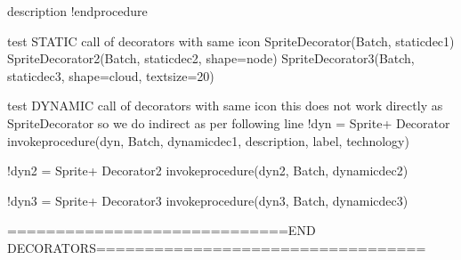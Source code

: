 \documentclass[letterpaper,10pt,english]{sphinxmanual}
\begin{document}
\begin{sphinxVerbatim}[commandchars=\\\{\},numbers=left,firstnumber=1,stepnumber=1]
  \PYGZdl{}description \PYGZdq{}
!endprocedure

\PYGZsq{} test STATIC call of decorators with same icon
\PYGZsq{}\PYGZhy{}\PYGZhy{}\PYGZhy{}\PYGZhy{}\PYGZhy{}\PYGZhy{}\PYGZhy{}\PYGZhy{}\PYGZhy{}\PYGZhy{}\PYGZhy{}\PYGZhy{}\PYGZhy{}\PYGZhy{}\PYGZhy{}\PYGZhy{}\PYGZhy{}\PYGZhy{}\PYGZhy{}\PYGZhy{}\PYGZhy{}\PYGZhy{}\PYGZhy{}\PYGZhy{}\PYGZhy{}\PYGZhy{}\PYGZhy{}\PYGZhy{}\PYGZhy{}\PYGZhy{}\PYGZhy{}\PYGZhy{}\PYGZhy{}\PYGZhy{}\PYGZhy{}\PYGZhy{}\PYGZhy{}\PYGZhy{}\PYGZhy{}\PYGZhy{}\PYGZhy{}\PYGZhy{}\PYGZhy{}\PYGZhy{}\PYGZhy{}\PYGZhy{}\PYGZhy{}\PYGZhy{}\PYGZhy{}\PYGZhy{}\PYGZhy{}
\PYGZdl{}SpriteDecorator(\PYGZdq{}\PYGZdl{}Batch\PYGZdq{}, \PYGZdq{}static\PYGZus{}dec1\PYGZdq{})
\PYGZdl{}SpriteDecorator2(\PYGZdq{}\PYGZdl{}Batch\PYGZdq{}, \PYGZdq{}static\PYGZus{}dec2\PYGZdq{}, \PYGZdl{}shape=\PYGZdq{}node\PYGZdq{})
\PYGZdl{}SpriteDecorator3(\PYGZdq{}\PYGZdl{}Batch\PYGZdq{}, \PYGZdq{}static\PYGZus{}dec3\PYGZdq{}, \PYGZdl{}shape=\PYGZdq{}cloud\PYGZdq{}, \PYGZdl{}textsize=\PYGZdq{}20\PYGZdq{})

\PYGZsq{} test DYNAMIC call of decorators with same icon
\PYGZsq{}\PYGZhy{}\PYGZhy{}\PYGZhy{}\PYGZhy{}\PYGZhy{}\PYGZhy{}\PYGZhy{}\PYGZhy{}\PYGZhy{}\PYGZhy{}\PYGZhy{}\PYGZhy{}\PYGZhy{}\PYGZhy{}\PYGZhy{}\PYGZhy{}\PYGZhy{}\PYGZhy{}\PYGZhy{}\PYGZhy{}\PYGZhy{}\PYGZhy{}\PYGZhy{}\PYGZhy{}\PYGZhy{}\PYGZhy{}\PYGZhy{}\PYGZhy{}\PYGZhy{}\PYGZhy{}\PYGZhy{}\PYGZhy{}\PYGZhy{}\PYGZhy{}\PYGZhy{}\PYGZhy{}\PYGZhy{}\PYGZhy{}\PYGZhy{}\PYGZhy{}\PYGZhy{}\PYGZhy{}\PYGZhy{}\PYGZhy{}\PYGZhy{}\PYGZhy{}\PYGZhy{}\PYGZhy{}\PYGZhy{}\PYGZhy{}\PYGZhy{}
\PYGZsq{}this does not work directly as \PYGZdl{}SpriteDecorator \PYGZhy{} so we do indirect as per following line
!\PYGZdl{}dyn = \PYGZdq{}\PYGZdl{}Sprite\PYGZdq{}+ \PYGZdq{}Decorator\PYGZdq{}
\PYGZpc{}invoke\PYGZus{}procedure(\PYGZdl{}dyn, \PYGZdq{}\PYGZdl{}Batch\PYGZdq{}, \PYGZdq{}dynamic\PYGZus{}dec1\PYGZdq{}, \PYGZdq{}description\PYGZdq{}, \PYGZdq{}label\PYGZdq{}, \PYGZdq{}technology\PYGZdq{})

!\PYGZdl{}dyn2 = \PYGZdq{}\PYGZdl{}Sprite\PYGZdq{}+ \PYGZdq{}Decorator2\PYGZdq{}
\PYGZpc{}invoke\PYGZus{}procedure(\PYGZdl{}dyn2, \PYGZdq{}\PYGZdl{}Batch\PYGZdq{}, \PYGZdq{}dynamic\PYGZus{}dec2\PYGZdq{})

!\PYGZdl{}dyn3 = \PYGZdq{}\PYGZdl{}Sprite\PYGZdq{}+ \PYGZdq{}Decorator3\PYGZdq{}
\PYGZpc{}invoke\PYGZus{}procedure(\PYGZdl{}dyn3, \PYGZdq{}\PYGZdl{}Batch\PYGZdq{}, \PYGZdq{}dynamic\PYGZus{}dec3\PYGZdq{})


\PYGZsq{}=============================END DECORATORS==================================




\end{sphinxVerbatim}
\end{document}
